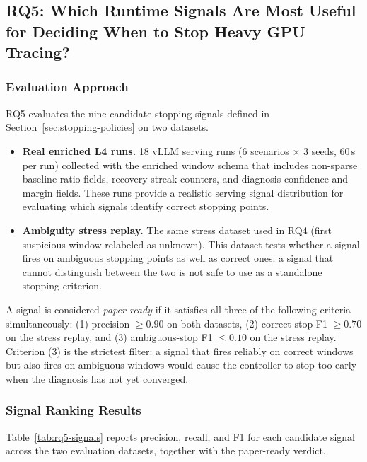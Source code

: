 \subsection{RQ5: Which Runtime Signals Are Most Useful for Deciding When to Stop Heavy GPU Tracing?}
\label{sec:rq5}

\subsubsection{Evaluation Approach}

RQ5 evaluates the nine candidate stopping signals defined in Section~\ref{sec:stopping-policies} on two datasets.

\begin{itemize}
  \item[] \textbf{Real enriched L4 runs.} 18 vLLM serving runs (6 scenarios $\times$ 3 seeds, 60\,s per run) collected with the enriched window schema that includes non-sparse baseline ratio fields, recovery streak counters, and diagnosis confidence and margin fields. These runs provide a realistic serving signal distribution for evaluating which signals identify correct stopping points.
  \item[] \textbf{Ambiguity stress replay.} The same stress dataset used in RQ4 (first suspicious window relabeled as unknown). This dataset tests whether a signal fires on ambiguous stopping points as well as correct ones; a signal that cannot distinguish between the two is not safe to use as a standalone stopping criterion.
\end{itemize}

A signal is considered \emph{paper-ready} if it satisfies all three of the following criteria simultaneously: (1) precision $\geq 0.90$ on both datasets, (2) correct-stop F1 $\geq 0.70$ on the stress replay, and (3) ambiguous-stop F1 $\leq 0.10$ on the stress replay. Criterion (3) is the strictest filter: a signal that fires reliably on correct windows but also fires on ambiguous windows would cause the controller to stop too early when the diagnosis has not yet converged.

\subsubsection{Signal Ranking Results}

Table~\ref{tab:rq5-signals} reports precision, recall, and F1 for each candidate signal across the two evaluation datasets, together with the paper-ready verdict.

